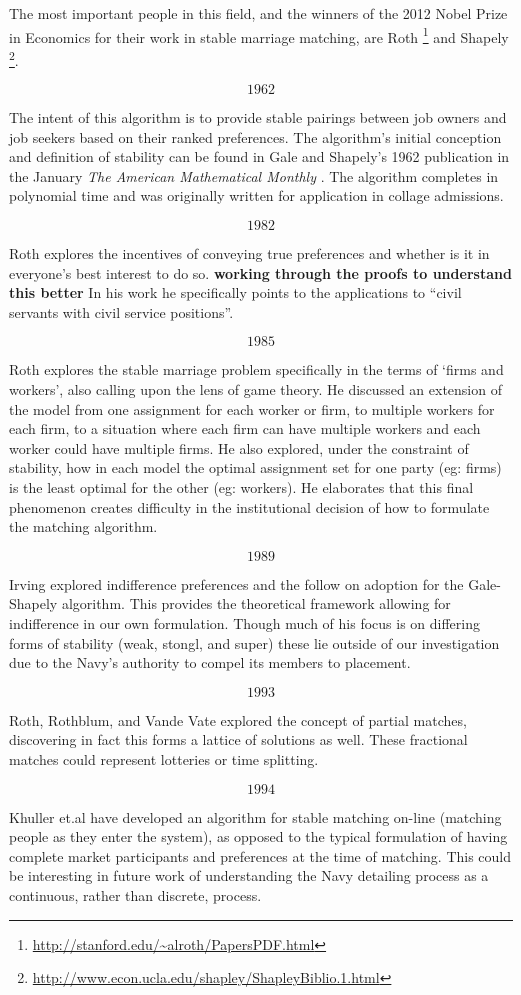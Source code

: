 The most important people in this field, and the winners of the 2012 Nobel Prize in Economics for their work in stable marriage matching, are Roth \footnote{\url{http://stanford.edu/~alroth/PapersPDF.html}} and Shapely \footnote{\url{http://www.econ.ucla.edu/shapley/ShapleyBiblio.1.html}}.

\[1962\]

The intent of this algorithm is to provide stable pairings between job owners and job seekers based on their ranked preferences. The algorithm's initial conception and definition of stability can be found in Gale and Shapely's 1962 publication in the January \textit{The American Mathematical Monthly} \cite{gale_shapely}. The algorithm completes in polynomial time and was originally written for application in collage admissions.

\[1982\]

Roth explores the incentives of conveying true preferences and whether is it in everyone's best interest to do so. \cite{incentives} \textbf{working through the proofs to understand this better} In his work he specifically points to the applications to ``civil servants with civil service positions''.

\[1985\]

Roth explores the stable marriage problem specifically in the terms of `firms and workers', also calling upon the lens of game theory.\cite{game} He discussed an extension of the model from one assignment for each worker or firm, to multiple workers for each firm, to a situation where each firm can have multiple workers and each worker could have multiple firms. He also explored, under the constraint of stability, how in each model the optimal assignment set for one party (eg: firms) is the least optimal for the other (eg: workers). He elaborates that this final phenomenon creates difficulty in the institutional decision of how to formulate the matching algorithm.

\[1989\]

Irving explored indifference preferences and the follow on adoption for the Gale-Shapely algorithm. \cite{indifference} This provides the theoretical framework allowing for indifference in our own formulation. Though much of his focus is on differing forms of stability (weak, stongl, and super) these lie outside of our investigation due to the Navy's authority to compel its members to placement.

\[1993\]

Roth, Rothblum, and Vande Vate explored the concept of partial matches, discovering in fact this forms a lattice of solutions as well. These fractional matches could represent lotteries or time splitting. \cite{partial}

\[1994\]

Khuller et.al have developed an algorithm for stable matching on-line (matching people as they enter the system), as opposed to the typical formulation of having complete market participants and preferences at the time of matching. \cite{online} This could be interesting in future work of understanding the Navy detailing process as a continuous, rather than discrete, process.